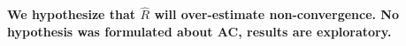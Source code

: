 \documentclass[article]{jss}
\begin{document}
\textbf{We hypothesize that $\widehat{R}$ will over-estimate non-convergence. No hypothesis was formulated about AC, results are exploratory.}
%
%







% 
% 
% 
% 
\end{document}
